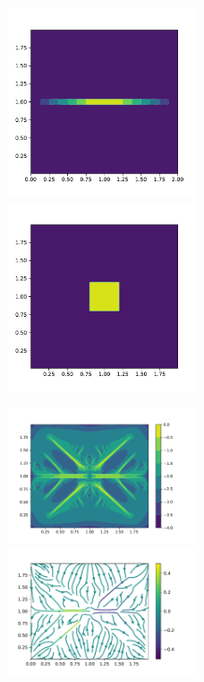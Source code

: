 \documentclass{article}
\theoremstyle{plain}
\theoremstyle{remark}
\theoremstyle{remark}
\theoremstyle{remark}
\numberwithin{equation}{section}
\begin{document}
\begin{figure}
  \includegraphics[width=0.5\textwidth]{2/m1}
  \includegraphics[width=0.5\textwidth]{2/s}
\end{figure}
\begin{figure}
  \includegraphics[width=0.5\textwidth]{2/PCG}
  \includegraphics[width=0.5\textwidth]{2/vector}
\end{figure}
\end{document}
